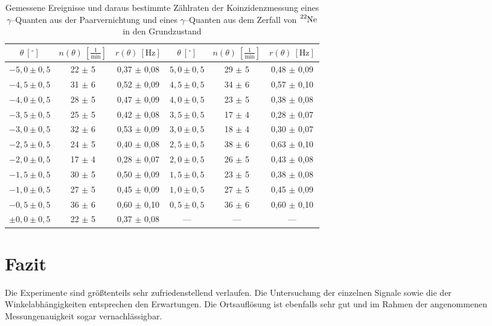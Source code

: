 \documentclass[12pt,a4paper]{scrartcl}
\numberwithin{equation}{section} %
\begin{document}
\begin{table}[h!]
	\centering
	\begin{tabular}{c|c|c||c|c|c}
		$\theta\ [^\circ]$ & $n(\theta)\ [\frac{1}{\mathrm{min}}]$ & $r(\theta)\ [\mathrm{Hz}]$ &
			$\theta\ [^\circ]$ & $n(\theta)\ [\frac{1}{\mathrm{min}}]$ & $r(\theta)\ [\mathrm{Hz}]$ \vspace{1pt}\\
		\hline 
		$-5,0 \pm 0,5$ & 22 $\pm$ 5 & 0,37 $\pm$ 0,08 &
			$5,0 \pm 0,5$ & 29 $\pm$ 5 & 0,48 $\pm$ 0,09 \\
		$-4,5 \pm 0,5$ & 31 $\pm$ 6 & 0,52 $\pm$ 0,09 &
			$4,5 \pm 0,5$ & 34 $\pm$ 6 & 0,57 $\pm$ 0,10 \\
		$-4,0 \pm 0,5$ & 28 $\pm$ 5 & 0,47 $\pm$ 0,09 &
			$4,0 \pm 0,5$ & 23 $\pm$ 5 & 0,38 $\pm$ 0,08 \\
		$-3,5 \pm 0,5$ & 25 $\pm$ 5 & 0,42 $\pm$ 0,08 &
			$3,5 \pm 0,5$ & 17 $\pm$ 4 & 0,28 $\pm$ 0,07 \\
		$-3,0 \pm 0,5$ & 32 $\pm$ 6 & 0,53 $\pm$ 0,09 &
			$3,0 \pm 0,5$ & 18 $\pm$ 4 & 0,30 $\pm$ 0,07 \\
		$-2,5 \pm 0,5$ & 24 $\pm$ 5 & 0,40 $\pm$ 0,08 &
			$2,5 \pm 0,5$ & 38 $\pm$ 6 & 0,63 $\pm$ 0,10 \\
		$-2,0 \pm 0,5$ & 17 $\pm$ 4 & 0,28 $\pm$ 0,07 &
			$2,0 \pm 0,5$ & 26 $\pm$ 5 & 0,43 $\pm$ 0,08 \\
		$-1,5 \pm 0,5$ & 30 $\pm$ 5 & 0,50 $\pm$ 0,09 &
			$1,5 \pm 0,5$ & 23 $\pm$ 5 & 0,38 $\pm$ 0,08 \\
		$-1,0 \pm 0,5$ & 27 $\pm$ 5 & 0,45 $\pm$ 0,09 &
			$1,0 \pm 0,5$ & 27 $\pm$ 5 & 0,45 $\pm$ 0,09 \\
		$-0,5 \pm 0,5$ & 36 $\pm$ 6 & 0,60 $\pm$ 0,10 &
			$0,5 \pm 0,5$ & 36 $\pm$ 6 & 0,60 $\pm$ 0,10 \\
		$\pm 0,0 \pm 0,5$ & 22 $\pm$ 5 & 0,37 $\pm$ 0,08 &---&---&---
	\end{tabular}
	\caption{Gemessene Ereignisse und daraus bestimmte Zählraten der Koinzidenzmessung eines $\gamma$--Quanten aus der Paarvernichtung und eines $\gamma$--Quanten aus dem Zerfall von $\ce{^{22}Ne}$ in den Grundzustand}
	\label{table:messwerte1275}
\end{table}

\clearpage
\hypertarget{fazit}{%
\section{Fazit}\label{fazit}}
Die Experimente sind größtenteils sehr zufriedenstellend verlaufen. Die Untersuchung der einzelnen Signale sowie die der Winkelabhängigkeiten entsprechen den Erwartungen. Die Ortsauflösung ist ebenfalls sehr gut und im Rahmen der angenommenen Messungenauigkeit sogar vernachlässigbar.
\end{document}

